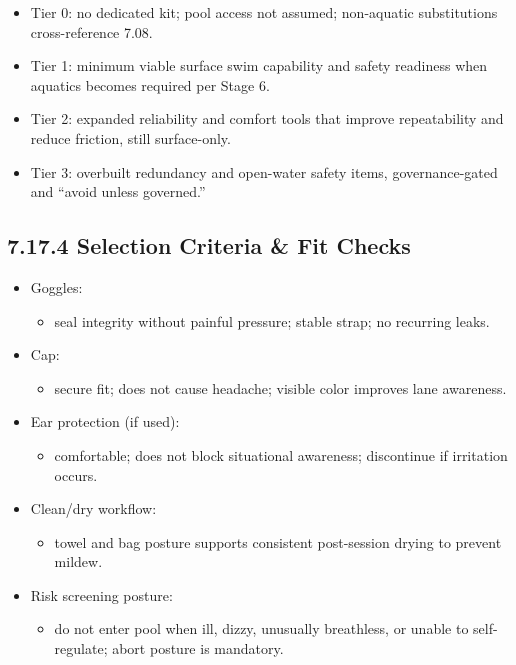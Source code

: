 \documentclass[10pt]{article}
\begin{document}
\begin{itemize}
\item Tier 0: no dedicated kit; pool access not assumed; non-aquatic substitutions cross-reference 7.08.
\item Tier 1: minimum viable surface swim capability and safety readiness when aquatics becomes required per Stage 6.
\item Tier 2: expanded reliability and comfort tools that improve repeatability and reduce friction, still surface-only.
\item Tier 3: overbuilt redundancy and open-water safety items, governance-gated and “avoid unless governed.”
\end{itemize}

\subsection*{7.17.4 Selection Criteria \& Fit Checks}
{}

\begin{itemize}
\item Goggles:
  \begin{itemize}
  \item seal integrity without painful pressure; stable strap; no recurring leaks.
  \end{itemize}
\item Cap:
  \begin{itemize}
  \item secure fit; does not cause headache; visible color improves lane awareness.
  \end{itemize}
\item Ear protection (if used):
  \begin{itemize}
  \item comfortable; does not block situational awareness; discontinue if irritation occurs.
  \end{itemize}
\item Clean/dry workflow:
  \begin{itemize}
  \item towel and bag posture supports consistent post-session drying to prevent mildew.
  \end{itemize}
\item Risk screening posture:
  \begin{itemize}
  \item do not enter pool when ill, dizzy, unusually breathless, or unable to self-regulate; abort posture is mandatory.
  \end{itemize}
\end{itemize}
\end{document}
